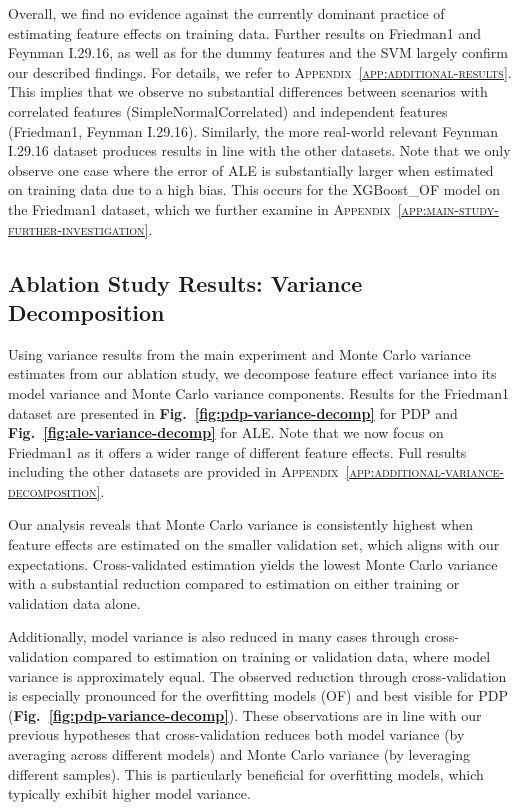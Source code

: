 \documentclass[runningheads]{llncs}
\begin{document}
Overall, we find no evidence against the currently dominant practice of
estimating feature effects on training data. Further results on Friedman1 and
Feynman I.29.16, as well as for the dummy features and the SVM largely confirm our
described findings. For details, we refer to
\textsc{Appendix~\ref{app:additional-results}}. This implies that we observe
no substantial differences between scenarios with correlated features
(SimpleNormalCorrelated) and independent features (Friedman1, Feynman I.29.16).
Similarly, the more real-world relevant Feynman I.29.16 dataset produces results
in line with the other datasets. Note that we only observe one case where the
error of ALE is substantially larger when estimated on training data due to a
high bias. This occurs for the XGBoost\_OF model on the Friedman1 dataset,
which we further examine in
\textsc{Appendix~\ref{app:main-study-further-investigation}}.

\subsection{Ablation Study Results: Variance Decomposition}\label{sec:results-variance-decomposition}

Using variance results from the main experiment and Monte Carlo variance estimates
from our ablation study, we decompose feature effect variance into its model
variance and Monte Carlo variance components.
Results for the Friedman1 dataset are presented in
\textbf{Fig.\@~\ref{fig:pdp-variance-decomp}} for PDP and
\textbf{Fig.\@~\ref{fig:ale-variance-decomp}} for ALE. Note that we now  %
focus on Friedman1 as it offers a wider range of different
feature effects. Full results including the other datasets are provided in
\textsc{Appendix~\ref{app:additional-variance-decomposition}}.

Our analysis reveals that Monte Carlo variance is consistently highest when feature
effects are estimated on the smaller validation set, which aligns with our
expectations. Cross-validated estimation yields the lowest Monte Carlo variance with
a substantial reduction compared to
estimation on either training or validation data alone.

Additionally, model variance is also reduced in many cases through cross-validation
compared to estimation on training or validation data, where model variance is
approximately equal. The observed reduction through cross-validation is especially
pronounced for the overfitting models (OF) and best visible for PDP
(\textbf{Fig.\@~\ref{fig:pdp-variance-decomp}}). These observations are in line
with our previous hypotheses that cross-validation reduces both model variance
(by averaging across different models) and Monte Carlo variance (by leveraging
different samples). This is particularly beneficial for overfitting models, which
typically exhibit higher model variance.
\end{document}
